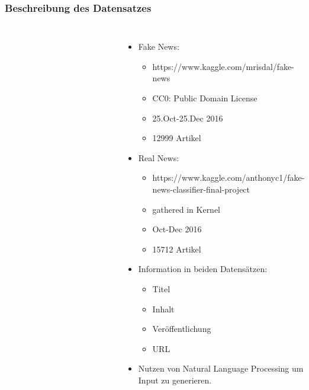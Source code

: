 \documentclass[aspectratio=1610, professionalfonts, 9pt]{beamer}
\begin{document}
  \begin{frame}
    \frametitle{Beschreibung des Datensatzes}
    \begin{columns}
      \begin{figure}
          \includegraphics[width=\textwidth]{pictures/fake.PNG}
          \caption{}
          \label{}
      \end{figure}
      \begin{figure}
          \includegraphics[width=\textwidth]{pictures/real.PNG}
          \caption{\cite{data}}
          \label{}
      \end{figure}
      \begin{itemize}
      \item Fake News:
      \begin{itemize}
        \item https://www.kaggle.com/mrisdal/fake-news
        \item CC0: Public Domain License
        \item 25.Oct-25.Dec 2016
        \item 12999 Artikel
      \end{itemize}     
      \item Real News: 
      \begin{itemize}
        \item https://www.kaggle.com/anthonyc1/fake-news-classifier-final-project
        \item gathered in Kernel 
        \item Oct-Dec 2016
        \item 15712 Artikel
      \end{itemize}
      \item Information in beiden Datensätzen:
      \begin{itemize}
      \item Titel
      \item Inhalt
      \item Veröffentlichung
      \item URL
      \end{itemize}
      \item Nutzen von Natural Language Processing um Input zu generieren.
      \end{itemize}
    \end{columns}
  \end{frame}
\end{document}
